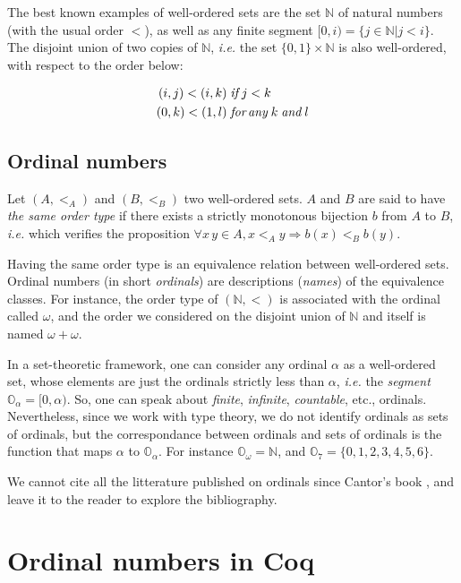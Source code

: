 The best known examples of well-ordered sets are the set $\mathbb{N}$ of natural numbers (with the usual order $<$), as well as any finite segment $[0,i)=\{j\in\mathbb{N}|j<i\}$.
The disjoint union of two copies of $\mathbb{N}$, \emph{i.e.} the set $\{0,1\}\times\mathbb{N}$ is also well-ordered,
with respect to the order below:

\begin{align*}
(i,j) < (i,k) & \;\textit{if} \; j < k\\
(0,k) < (1,l) & \;\textit{for\,any}\;k \;\textit{and} \; l
\end{align*}

\subsection{Ordinal numbers}


Let $(A,<_A)$ and $(B,<_B)$ two well-ordered sets. $A$ and $B$ are said to have \emph{the same order type} if 
there exists a strictly monotonous bijection $b$ from $A$ to $B$, \emph{i.e.} which verifies the proposition
$\forall x\,y\in A, x <_A y \Rightarrow b(x) <_B  b(y)$.

Having the same order type is an equivalence relation between well-ordered sets. Ordinal numbers (in short \emph{ordinals}) are descriptions (\emph{names}) of the equivalence classes.
For instance, the order type of $(\mathbb{N},<)$ is associated with the ordinal called  $\omega$, and the order we considered on 
the disjoint union of $\mathbb{N}$ and itself is named $\omega+\omega$.

In a set-theoretic framework, one can consider any ordinal $\alpha$ as a well-ordered set, whose  elements are just the ordinals strictly less than $\alpha$, \emph{i.e.} the \emph{segment} $\mathbb{O}_\alpha=[0, \alpha)$. So, one can speak about \emph{finite}, \emph{infinite}, \emph{countable}, etc., ordinals. Nevertheless, since we work with type theory, 
we do not identify ordinals as sets of ordinals, but the correspondance between ordinals and sets of ordinals is the function that maps $\alpha$ to $\mathbb{O}_\alpha$.
For instance $\mathbb{O}_\omega=\mathbb{N}$, and $\mathbb{O}_7=\{0,1,2,3,4,5,6\}$.


We cannot cite all the litterature published on ordinals since Cantor's book 
\cite{cantorbook}, and 
leave it to the reader to explore the bibliography. 


\section{Ordinal numbers in Coq}

